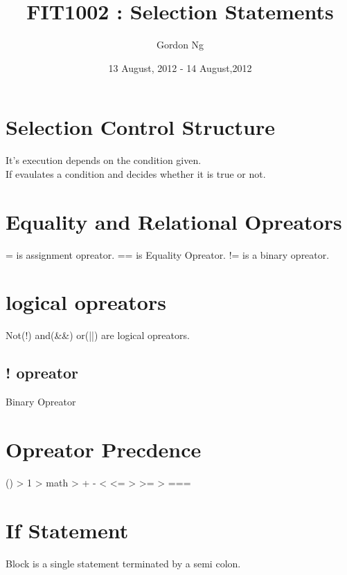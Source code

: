 \documentclass[12pt]{article}
\begin{document}
\title{FIT1002 : Selection Statements}
\date{13 August, 2012 - 14 August,2012 }
\author{Gordon Ng}
\maketitle

\pagebreak
\tableofcontents
\pagebreak

\section{Selection Control Structure}
It's execution depends on the condition given.\\
If evaulates a condition and decides whether it is true or not.\\

\section{Equality and Relational Opreators}
= is assignment opreator. == is Equality Opreator.
!= is a binary opreator.

\section{logical opreators}
Not(!) and(&&) or(||) are logical opreators.
\subsection{! opreator}
Binary Opreator
\section{Opreator Precdence}
() > 1 > math > + \bigger - < <=  > >=  > ===
\section{If Statement}
Block is a single statement terminated by a semi colon.
\end{document}

